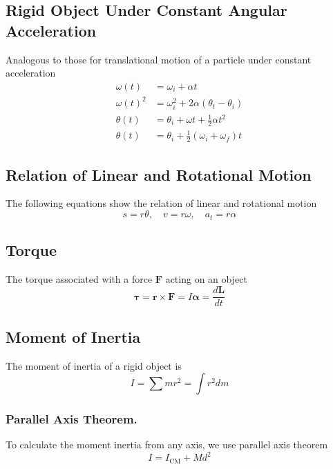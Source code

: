 \documentclass[../../../main.tex]{subfiles}
\begin{document}
\subsection{Rigid Object Under Constant Angular Acceleration} Analogous to those for translational motion of a particle under constant acceleration
\begin{align*}
    \omega(t)&=\omega_i+\alpha t\\
    \omega(t)^2&=\omega_i^2+2\alpha(\theta_t-\theta_i)\\
    \theta(t)&=\theta_i +\omega t+\frac{1}{2}\alpha t^2\\
    \theta(t)&=\theta_i+\frac{1}{2}(\omega_i+\omega_f)t
\end{align*}

\subsection{Relation of Linear and Rotational Motion}
The following equations show the relation of linear and rotational motion
\begin{equation*}
    s=r\theta,\quad v=r\omega,\quad a_t=r\alpha
\end{equation*}

\subsection{Torque}
The torque associated with a force $\mathbf{F}$ acting on an object
\begin{equation*}
    \boldsymbol{\tau}=\mathbf{r}\times\mathbf{F}=I \mathbf{\alpha} =\frac{d\mathbf{L}}{dt}
\end{equation*}

\subsection{Moment of Inertia}
The moment of inertia of a rigid object is 
\begin{equation*}
    I=\sum mr^2=\int r^2 dm
\end{equation*}

\subsubsection{Parallel Axis Theorem.} To calculate the moment inertia from any axis, we use parallel axis theorem 
\begin{equation*}
    I=I_\text{CM}+Md^2
\end{equation*}
\end{document}
